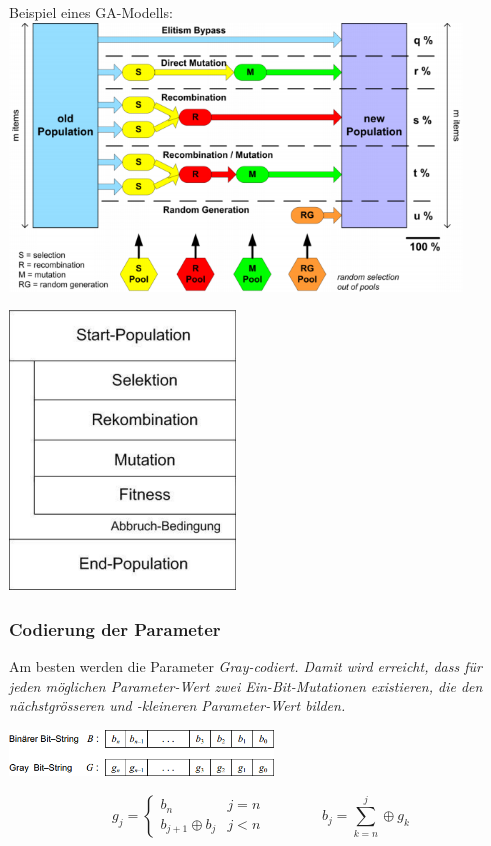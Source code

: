   \begin{minipage}{12cm}  
    Beispiel eines GA-Modells:\\
    \includegraphics[width=12cm]{./Content/MetaHeuristics/GeneticAlgorithms_Model}
  \end{minipage}
  \begin{minipage}{7cm}
    \begin{flushright}
      \includegraphics[width=6cm]{./Content/MetaHeuristics/GeneticAlgorithms_Principle}
    \end{flushright}
  \end{minipage}
    \subsubsection{Codierung der Parameter }
      Am besten werden die Parameter \em Gray\em -codiert. Damit wird erreicht, dass für jeden möglichen Parameter-Wert zwei Ein-Bit-Mutationen existieren, die den nächstgrösseren und -kleineren Parameter-Wert bilden.
      
      \begin{center}
        \includegraphics[width=7cm]{./Content/MetaHeuristics/GeneticAlgorithms_Gray}
      \end{center}
      $$g_j = \begin{cases}
        b_n                & j=n\\
        b_{j+1} \oplus b_j & j < n
        \end{cases} \qquad \qquad 
      b_j = \sum \limits_{k=n}^j \oplus g_k$$
  
